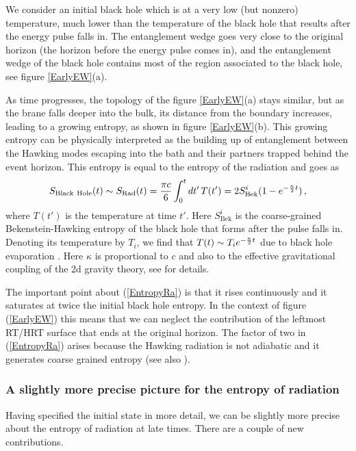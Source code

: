 \documentclass[11pt]{article}
\newcommand{\be}{\begin{equation}}
\newcommand{\ee}{\end{equation}}
\def\la{\label}
\def\nref#1{(\ref{#1})}
\begin{document}
We consider an initial black hole which is at a very low (but nonzero) temperature, much lower than the temperature of the black hole that results after the energy pulse falls in.
The entanglement wedge goes very close to the original horizon (the horizon before the energy pulse comes in), and the entanglement wedge of the black hole contains most of the region associated to the black hole, see figure \ref{EarlyEW}(a).

As time progresses, the topology of the figure \ref{EarlyEW}(a) stays similar, but as the brane falls deeper into the bulk, its distance from the boundary increases, leading to a growing entropy, as shown in figure \ref{EarlyEW}(b).
This growing entropy can be physically interpreted as the building up of entanglement between the Hawking modes escaping into the bath and their partners trapped behind the event horizon.
This entropy is equal to the entropy of the radiation and goes as 
\be 
\la{EntropyRa}
    S_{\rm Black ~Hole}(t) \sim S_{\rm Rad}(t) =  
    \frac{\pi c}{6} \int_0^t dt'\,   T(t') = 2 S^i_{\text{Bek}} ( 1 - e^{-{\kappa \over 2}  t })\, ,
\ee
where $T(t')$ is the temperature at time $t'$. 
Here $S^i_{\text{Bek}}$ is the coarse-grained Bekenstein-Hawking entropy of the black hole that forms after the pulse falls in. 
Denoting its temperature by $T_i$, we find that $T(t) \sim  T_i e^{ - {\kappa \over 2} t} $ due to black hole evaporation \cite{Engelsoy:2016xyb}. 
Here $\kappa$ is proportional to $c$ and also to the effective gravitational coupling of the 2d gravity theory, see \cite{Almheiri:2019psf} for details.
       
The important point about \nref{EntropyRa} is that it rises continuously and it saturates at twice the initial black hole entropy.
In the context of figure \nref{EarlyEW} this means that we can neglect the contribution of the leftmost RT/HRT surface that ends at the original horizon. 
The factor of two in \nref{EntropyRa} arises because the Hawking radiation is not adiabatic and it generates coarse grained entropy \cite{Page:2013dx} (see also \cite{Penington:2019npb}).    

\subsubsection{A slightly more precise picture for the entropy of radiation} 
     
Having specified the initial state in more detail, we can be slightly more precise about the entropy of radiation at late times. 
There are a couple of new contributions.
\end{document}
